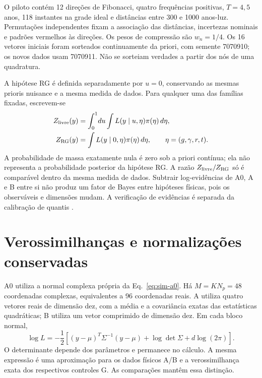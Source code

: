 O piloto contém 12 direções de Fibonacci, quatro frequências positivas,
\(T=4{,}5\) anos, 118 instantes na grade ideal e distâncias entre 300 e
1000 anos-luz. Permutações independentes fixam a associação das
distâncias, incertezas nominais e padrões vermelhos às direções. Os pesos
de compressão são \(w_n=1/4\). Os 16 vetores iniciais foram sorteados
continuamente da priori, com semente 7070910; os novos dados usam
7070911. Não se sorteiam verdades a partir dos nós de uma quadratura.

A hipótese RG é definida separadamente por \(u=0\), conservando as
mesmas prioris nuisance e a mesma medida de dados. Para qualquer uma
das famílias fixadas, escrevem-se
\begin{align}
 Z_{\rm livre}(y)&=\int_0^1\!du\int
                 L(y\mid u,\eta)\pi(\eta)\,d\eta,\nonumber\\
 Z_{\rm RG}(y)&=\int L(y\mid0,\eta)\pi(\eta)\,d\eta,
 \qquad \eta=(g,\gamma,r,t).
 \label{eq:inf-evidencias}
\end{align}
A probabilidade de massa exatamente nula é zero sob a priori contínua;
ela não representa a probabilidade posterior da hipótese RG. A razão
\(Z_{\rm livre}/Z_{\rm RG}\) só é comparável dentro da mesma medida
de dados. Subtrair log-evidências de A0, A e B entre si não produz um
fator de Bayes entre hipóteses físicas, pois os observáveis e dimensões
mudam. A verificação de evidências é separada da calibração de quantis
\cite{modrak2026bayes}.

\section{Verossimilhanças e normalizações conservadas}

A0 utiliza a normal complexa própria da
Eq.~\eqref{eq:sim-a0}. Há \(M=KN_p=48\) coordenadas complexas,
equivalentes a 96 coordenadas reais. A utiliza quatro vetores reais
de dimensão dez, com a média e a covariância exatas das estatísticas
quadráticas; B utiliza um vetor comprimido de dimensão dez. Em cada
bloco normal,
\begin{equation}
 \log L=-\frac12\left[
 (y-\mu)^T\Sigma^{-1}(y-\mu)+\log\det\Sigma
                         +d\log(2\pi)\right].
 \label{eq:inf-normal}
\end{equation}
O determinante depende dos parâmetros e permanece no cálculo. A mesma
expressão é uma aproximação para os dados físicos A/B e a verossimilhança
exata dos respectivos controles G. As comparações mantêm essa distinção.

